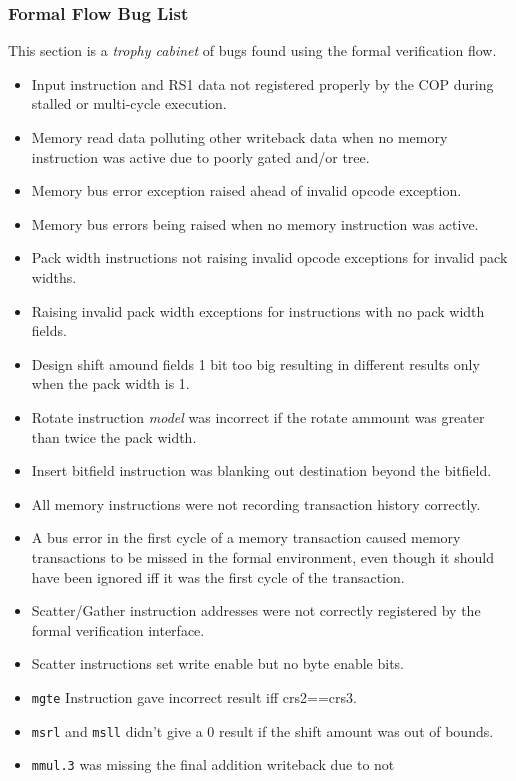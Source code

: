 \subsubsection{Formal Flow Bug List}

This section is a {\em trophy cabinet} of bugs found using the formal
verification flow.

\begin{itemize}
\item Input instruction and RS1 data not registered properly by the COP during
    stalled or multi-cycle execution.
\item Memory read data polluting other writeback data when no memory
    instruction was active due to poorly gated and/or tree.
\item Memory bus error exception raised ahead of invalid opcode exception.
\item Memory bus errors being raised when no memory instruction was active.
\item Pack width instructions not raising invalid opcode exceptions for
    invalid pack widths.
\item Raising invalid pack width exceptions for instructions with no pack
    width fields.
\item Design shift amound fields 1 bit too big resulting in different results
    only when the pack width is 1.
\item Rotate instruction {\em model} was incorrect if the rotate ammount was
    greater than twice the pack width.
\item Insert bitfield instruction was blanking out destination beyond the
    bitfield.
\item All memory instructions were not recording transaction history correctly.
\item A bus error in the first cycle of a memory transaction caused memory
    transactions to be missed in the formal environment, even though it
    should have been ignored iff it was the first cycle of the transaction.
\item Scatter/Gather instruction addresses were not correctly registered
    by the formal verification interface.
\item Scatter instructions set write enable but no byte enable bits.
\item {\tt mgte} Instruction gave incorrect result iff crs2==crs3.
\item {\tt msrl} and {\tt msll} didn't give a 0 result if the shift
    amount was out of bounds.
\item {\tt mmul.3} was missing the final addition writeback due to not

\end{itemize}
